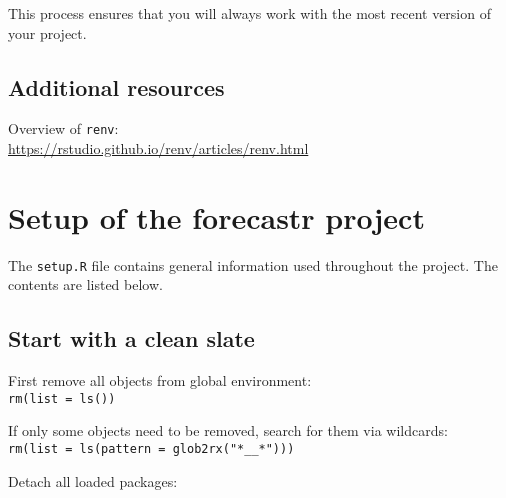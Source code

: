 \documentclass[
  letterpaper,
  DIV=11,
  numbers=noendperiod]{scrreport}
\newenvironment{Shaded}{\begin{snugshade}}{\end{snugshade}}
\newcommand{\AttributeTok}[1]{\textcolor[rgb]{0.40,0.45,0.13}{#1}}
\newcommand{\ConstantTok}[1]{\textcolor[rgb]{0.56,0.35,0.01}{#1}}
\newcommand{\ControlFlowTok}[1]{\textcolor[rgb]{0.00,0.23,0.31}{\textbf{#1}}}
\newcommand{\FunctionTok}[1]{\textcolor[rgb]{0.28,0.35,0.67}{#1}}
\newcommand{\NormalTok}[1]{\textcolor[rgb]{0.00,0.23,0.31}{#1}}
\newcommand{\SpecialCharTok}[1]{\textcolor[rgb]{0.37,0.37,0.37}{#1}}
\newcommand{\StringTok}[1]{\textcolor[rgb]{0.13,0.47,0.30}{#1}}
\begin{document}
This process ensures that you will always work with the most recent
version of your project.

\section{Additional resources}\label{additional-resources-2}

Overview of \texttt{renv}:\\
\url{https://rstudio.github.io/renv/articles/renv.html}


\chapter{Setup of the forecastr project}\label{sec-setup}

The \texttt{setup.R} file contains general information used throughout
the project. The contents are listed below.

\section{Start with a clean slate}\label{start-with-a-clean-slate}

First remove all objects from global environment:\\
\texttt{rm(list\ =\ ls())}

If only some objects need to be removed, search for them via
wildcards:\\
\texttt{rm(list\ =\ ls(pattern\ =\ glob2rx("*\_\_*")))}

Detach all loaded packages:

\begin{Shaded}
\end{Shaded}
\end{document}

